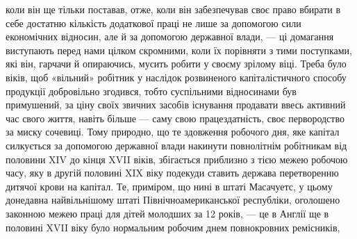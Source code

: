 \parcont{}  %
коли він ще тільки поставав, отже, коли він забезпечував своє
право вбирати в себе достатню кількість додаткової праці не
лише за допомогою сили економічних відносин, але й за допомогою
державної влади, — ці домагання виступають перед нами
цілком скромними, коли їх порівняти з тими поступками, які
він, гарчачи й опираючись, мусить робити у своєму зрілому віці.
Треба було віків, щоб «вільний» робітник у наслідок розвиненого
капіталістичного способу продукції добровільно згодився, тобто
суспільними відносинами був примушений, за ціну своїх звичних
засобів існування продавати ввесь активний час свого
життя, навіть більше — саму свою працездатність, своє первородство
за миску сочевиці. Тому природно, що те здовження
робочого дня, яке капітал силкується за допомогою державної
влади накинути повнолітнім робітникам від половини XIV до
кінця XVII віків, збігається приблизно з тією межею робочою
часу, яку в другій половині XIX віку подекуди ставить держава
перетворенню дитячої крови на капітал. Те, приміром, що нині
в штаті Масачуетс, у цьому донедавна найвільнішому штаті
Північноамериканської республіки, оголошено законною межею
праці для дітей молодших за 12 років, — це в Англії ще в половині
XVII віку було нормальним робочим днем повнокровних ремісників,
